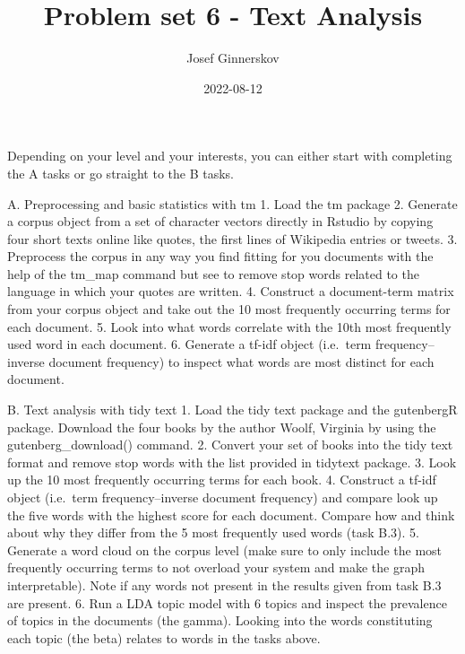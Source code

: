 \documentclass[
]{article}
\title{Problem set 6 - Text Analysis}
\author{Josef Ginnerskov}
\date{2022-08-12}
\begin{document}
\maketitle

Depending on your level and your interests, you can either start with
completing the A tasks or go straight to the B tasks.

A. Preprocessing and basic statistics with tm 1. Load the tm package 2.
Generate a corpus object from a set of character vectors directly in
Rstudio by copying four short texts online like quotes, the first lines
of Wikipedia entries or tweets. 3. Preprocess the corpus in any way you
find fitting for you documents with the help of the tm\_map command but
see to remove stop words related to the language in which your quotes
are written. 4. Construct a document-term matrix from your corpus object
and take out the 10 most frequently occurring terms for each document.
5. Look into what words correlate with the 10th most frequently used
word in each document. 6. Generate a tf-idf object (i.e.~term
frequency--inverse document frequency) to inspect what words are most
distinct for each document.

B. Text analysis with tidy text 1. Load the tidy text package and the
gutenbergR package. Download the four books by the author Woolf,
Virginia by using the gutenberg\_download() command. 2. Convert your set
of books into the tidy text format and remove stop words with the list
provided in tidytext package. 3. Look up the 10 most frequently
occurring terms for each book. 4. Construct a tf-idf object (i.e.~term
frequency--inverse document frequency) and compare look up the five
words with the highest score for each document. Compare how and think
about why they differ from the 5 most frequently used words (task B.3).
5. Generate a word cloud on the corpus level (make sure to only include
the most frequently occurring terms to not overload your system and make
the graph interpretable). Note if any words not present in the results
given from task B.3 are present. 6. Run a LDA topic model with 6 topics
and inspect the prevalence of topics in the documents (the gamma).
Looking into the words constituting each topic (the beta) relates to
words in the tasks above.
\end{document}
